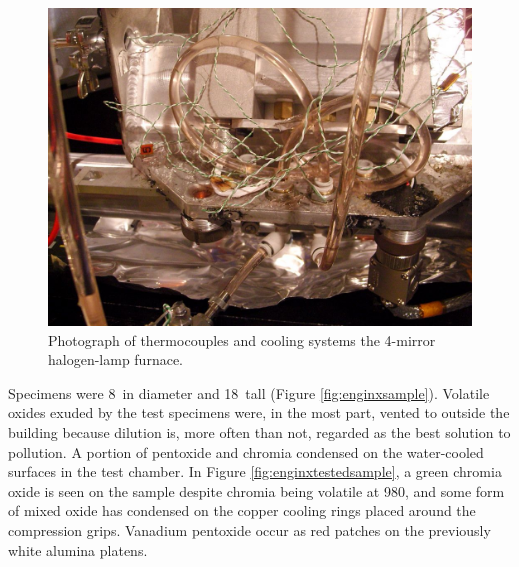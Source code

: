 \begin{figure}[H]
\begin{center}
\includegraphics[width=12cm]{enginxtc}
\caption{Photograph of thermocouples and cooling systems the 4-mirror halogen-lamp furnace.}\label{fig:enginxtc}
\end{center}
\end{figure}
%
Specimens were 8\milli\metre\ in diameter and 18\milli\metre\ tall (Figure \ref{fig:enginxsample}).  Volatile oxides exuded by the test specimens were, in the most part, vented to outside the building because dilution is, more often than not, regarded as the best solution to pollution.  A portion of pentoxide and chromia condensed on the water-cooled surfaces in the test chamber.  In Figure \ref{fig:enginxtestedsample}, a green chromia oxide is seen on the sample despite chromia being volatile at 980\celsius, and some form of mixed oxide has condensed on the copper cooling rings placed around the compression grips. Vanadium pentoxide occur as red patches on the previously white alumina platens.
%
